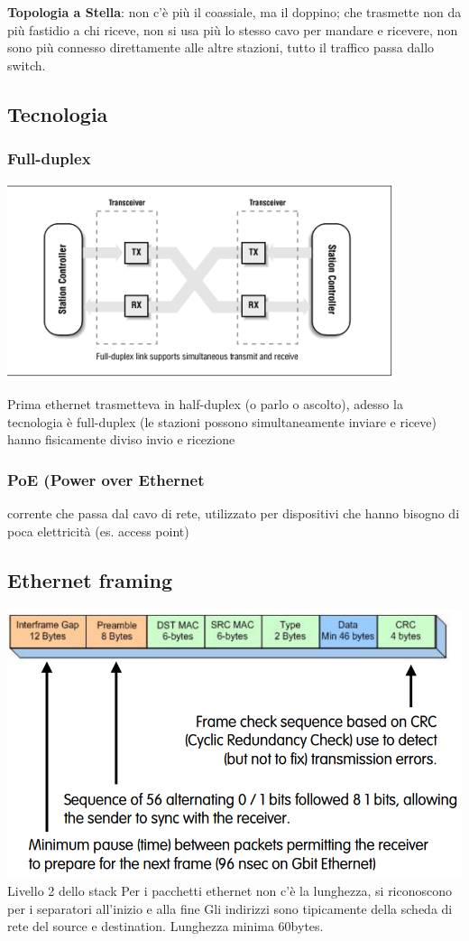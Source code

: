 \documentclass{article}
\begin{document}
\par \textbf{Topologia a Stella}: non c'è più il coassiale, ma il doppino; che trasmette non da più fastidio a chi riceve, non si usa più lo stesso cavo per mandare e ricevere, non sono più connesso direttamente alle altre stazioni, tutto il traffico passa dallo switch.

\subsection{Tecnologia}
\subsubsection{Full-duplex}
\includegraphics[]{3.png}

\par Prima ethernet trasmetteva in half-duplex (o parlo o ascolto), adesso la tecnologia è full-duplex (le stazioni possono simultaneamente inviare e riceve) hanno fisicamente diviso invio e ricezione

\subsubsection{PoE (Power over Ethernet}
\par corrente che passa dal cavo di rete, utilizzato per dispositivi che hanno bisogno di poca elettricità (es. access point)


\subsection{Ethernet framing}
\includegraphics[width=\linewidth]{4.png}
Livello 2 dello stack
Per i pacchetti ethernet non c'è la lunghezza, si riconoscono per i separatori all'inizio e alla fine
Gli indirizzi sono tipicamente della scheda di rete del source e destination.
Lunghezza minima 60bytes. 
\end{document}
